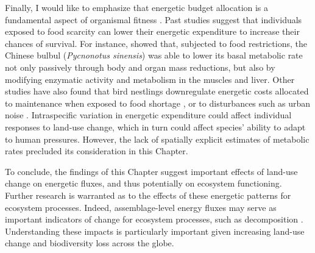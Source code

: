 
Finally, I would like to emphasize that energetic budget allocation is a fundamental aspect of organismal fitness \citep{Burger2021}. Past studies suggest that individuals exposed to food scarcity can lower their energetic expenditure to increase their chances of survival. For instance, \citet{Zhang2018} showed that, subjected to food restrictions, the Chinese bulbul (\textit{Pycnonotus sinensis}) was able to lower its basal metabolic rate not only passively through body and organ mass reductions, but also by modifying enzymatic activity and metabolism in the muscles and liver. Other studies have also found that bird nestlings downregulate energetic costs allocated to maintenance when exposed to food shortage \citep{Brzek2001, Moe2004}, or to disturbances such as urban noise \citep{Brischoux2017}. Intraspecific variation in energetic expenditure could affect individual responses to land-use change, which in turn could affect species’ ability to adapt to human pressures. However, the lack of spatially explicit estimates of metabolic rates precluded its consideration in this Chapter.

To conclude, the findings of this Chapter suggest important effects of land-use change on energetic fluxes, and thus potentially on ecosystem functioning. Further research is warranted as to the effects of these energetic patterns for ecosystem processes. Indeed, assemblage-level energy fluxes may serve as important indicators of change for ecosystem processes, such as decomposition \citep{Barnes2014}. Understanding these impacts is particularly important given increasing land-use change and biodiversity loss across the globe.
